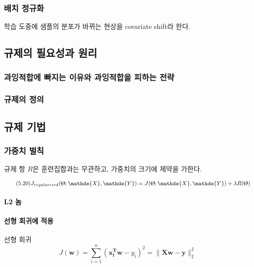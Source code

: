 \documentclass [12pt] {oblivoir}
\let\oldsubsubsection=\subsubsection
\renewcommand{\subsubsection}
{
  \filbreak
  \oldsubsubsection
}
\begin{document}
\subsubsection{배치 정규화}

학습 도중에 샘플의 분포가 바뀌는 현상을 covariate shift라 한다.

\subsection{규제의 필요성과 원리}

\subsubsection{과잉적합에 빠지는 이유와 과잉적합을 피하는 전략}

\subsubsection{규제의 정의}

\subsection{규제 기법}

\subsubsection{가중치 벌칙}
규제 항 $R$은 훈련집합과는 무관하고, 가중치의 크기에 제약을 가한다.

\begin{equation} \tag{5.20}
  J_{regularized}(\Uptheta; \mathds{X}, \mathds{Y}) = J(\Uptheta; \mathds{X}, \mathds{Y}) + \lambda R(\Uptheta)
\end{equation}

\paragraph*{L2 놈}\mbox{}

\vspace{3mm}

\paragraph*{선형 회귀에 적용}\mbox{}

선형 회귀
\begin{equation} \tag{5.26}
  J(\mathbf{w}) = \sum_{i=1}^{n}(\mathbf{x_{i}^{T}w} - y_{i})^{2} = \lVert \mathbf{Xw - y} \rVert_{2}^{2}
\end{equation}
\end{document}
